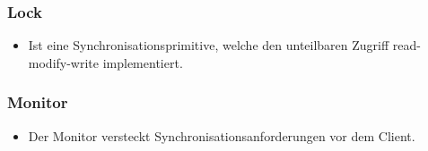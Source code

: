 \subsubsection{Lock}
  \begin{itemize}
  \item Ist eine Synchronisationsprimitive, welche den unteilbaren Zugriff read-modify-write
  implementiert.
  \end{itemize}
\subsubsection{Monitor}
  \begin{itemize}
  \item Der Monitor versteckt Synchronisationsanforderungen vor dem Client.
  \end{itemize}